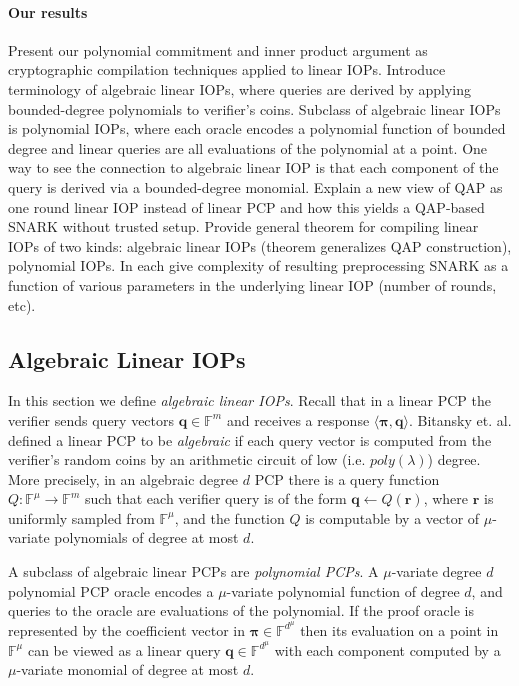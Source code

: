 \paragraph{Our results} Present our polynomial commitment and inner product argument as cryptographic compilation techniques applied to linear IOPs. Introduce terminology of algebraic linear IOPs, where queries are derived by applying bounded-degree polynomials to verifier’s coins. Subclass of algebraic linear IOPs is polynomial IOPs, where each oracle encodes a polynomial function of bounded degree and linear queries are all evaluations of the polynomial at a point. One way to see the connection to algebraic linear IOP is that each component of the query is derived via a bounded-degree monomial. 
Explain a new view of QAP as one round linear IOP instead of linear PCP and how this yields a QAP-based SNARK without trusted setup. Provide general theorem for compiling linear IOPs of two kinds: algebraic linear IOPs (theorem generalizes QAP construction), polynomial IOPs. In each give complexity of resulting preprocessing SNARK as a function of various parameters in the underlying linear IOP (number of rounds, etc). 

\subsection{Algebraic Linear IOPs} 

In this section we define \emph{algebraic linear IOPs}. Recall that in a linear PCP the verifier sends query vectors $\mathbf{q} \in \mathbb{F}^m$ and receives a response $\langle \boldsymbol{\pi}, \mathbf{q} \rangle$. Bitansky et. al. \cite{Bitansky} defined a linear PCP to be \emph{algebraic} if each query vector is computed from the verifier's random coins by an arithmetic circuit of low (i.e. $poly(\lambda)$) degree. More precisely, in an algebraic degree $d$ PCP there is a query function $Q: \mathbb{F}^\mu \rightarrow \mathbb{F}^m$ such that each verifier query is of the form $\mathbf{q} \leftarrow Q(\mathbf{r})$, where $\mathbf{r}$ is uniformly sampled from $\mathbb{F}^\mu$, and the function $Q$ is computable by a vector of $\mu$-variate polynomials of degree at most $d$. 

A subclass of algebraic linear PCPs are \emph{polynomial PCPs}. A $\mu$-variate degree $d$ polynomial PCP oracle encodes a $\mu$-variate polynomial function of degree $d$, and queries to the oracle are evaluations of the polynomial. If the proof oracle is represented by the coefficient vector in $\boldsymbol{\pi} \in \mathbb{F}^{d^\mu}$ then its evaluation on a point in $\mathbb{F}^\mu$ can be viewed as a linear query $\mathbf{q} \in \mathbb{F}^{d^\mu}$ with each component computed by a $\mu$-variate monomial of degree at most $d$. 

